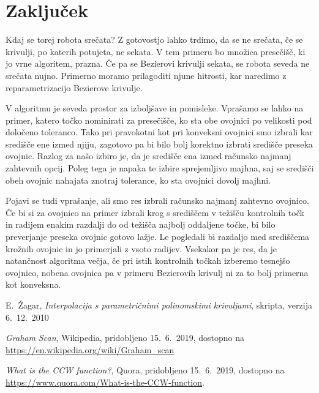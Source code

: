 \documentclass[a4paper, 12pt]{article} %
\begin{document}
\section{Zaključek}

Kdaj se torej robota srečata? Z gotovostjo lahko trdimo, da se ne srečata, če se krivulji, po katerih potujeta, ne sekata. V tem primeru bo množica presečišč, ki jo vrne algoritem, prazna. Če pa se Bezierovi krivulji sekata, se robota seveda ne srečata nujno. Primerno moramo prilagoditi njune hitrosti, kar naredimo z reparametrizacijo Bezierove krivulje.

V algoritmu je seveda prostor za izboljšave in pomisleke. Vprašamo se lahko na primer, katero točko nominirati za presečišče, ko sta obe ovojnici po velikosti pod določeno toleranco. Tako pri pravokotni kot pri konveksni ovojnici smo izbrali kar središče ene izmed njiju, zagotovo pa bi bilo bolj korektno izbrati središče preseka ovojnic. Razlog za našo izbiro je, da je središče ena izmed računsko najmanj zahtevnih opcij. Poleg tega je napaka te izbire sprejemljivo majhna, saj se središči obeh ovojnic nahajata znotraj tolerance, ko sta ovojnici dovolj majhni.

Pojavi se tudi vprašanje, ali smo res izbrali računsko najmanj zahtevno ovojnico. Če bi si za ovojnico na primer izbrali krog s središčem v težišču kontrolnih točk in radijem enakim razdalji do od težišča najbolj oddaljene točke, bi bilo preverjanje preseka ovojnic gotovo lažje. Le pogledali bi razdaljo med središčema krožnih ovojnic in jo primerjali z vsoto radijev.
Vsekakor pa je res, da je natančnost algoritma večja, če pri istih kontrolnih točkah izberemo tesnejšo ovojnico, nobena ovojnica pa v primeru Bezierovih krivulj ni za to bolj primerna kot konveksna.

\begin{thebibliography}{9}

E.~Žagar, \emph{Interpolacija s parametričnimi polinomskimi krivuljami}, skripta, verzija 6.~12.~2010

\emph{Graham Scan}, Wikipedia, pridobljeno 15.~6.~2019, dostopno na \url{https://en.wikipedia.org/wiki/Graham_scan}

\emph{What is the CCW function?}, Quora, pridobljeno 15.~6.~2019, dostopno na \url{https://www.quora.com/What-is-the-CCW-function}.
\end{thebibliography}
\end{document}
